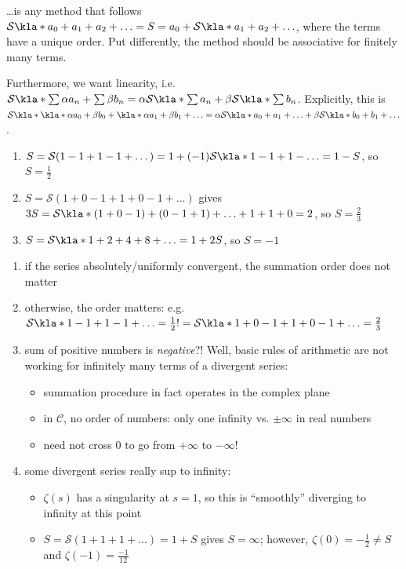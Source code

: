 \documentclass[english, parskip=full]{scrbook}
\newcommand{\definition}[2]{\begin{tcolorbox}[colback=colorbackgrounddefinition,colframe=colordefinition, breakable,enhanced,title=\textbf{#1}.]#2\end{tcolorbox}}
\newcommand{\note}[1]{\begin{tcolorbox}[colback=colorbackgroundnote,colframe=colornote, breakable,enhanced]#1\end{tcolorbox}}
\newcommand{\example}[3]{\begin{tcolorbox}[colback=colorbackgroundexample,colframe=colorexample, breakable,enhanced,title={\textbf{#1}: #2.}]#3\end{tcolorbox}}
\begin{document}
\definition{Generic Summation}{
\dots is any method that follows $\mathcal{S}\kla*{a_0+a_1+a_2+\dots}=S=a_0 + \mathcal{S}\kla*{a_1+a_2+\dots}$, where the terms have a unique order.
Put differently, the method should be associative for finitely many terms.

Furthermore, we want linearity, i.e. $\mathcal{S}\kla*{\sum \alpha a_n + \sum \beta b_n} = \alpha \mathcal{S}\kla*{\sum a_n} + \beta \mathcal{S}\kla*{\sum b_n}$.
Explicitly, this is $\mathcal{S}\kla*{\kla*{\alpha a_0 + \beta b_0} + \kla*{\alpha a_1 + \beta b_1} + \dots} = \alpha \mathcal{S}\kla*{a_0 + a_1 + \dots} + \beta \mathcal{S}\kla*{b_0 + b_1 + \dots}$.
\example{Example}{}{
\begin{enumerate}
\item $S=\mathcal{S}(1-1+1-1+\dots) = 1 + (-1) \mathcal{S}\kla*{1 - 1+1-\dots} = 1-S$, so $S=\frac{1}{2}$
\item $S=\mathcal{S}(1+0-1+1+0-1+\dots)$ gives $3S=\mathcal{S}\kla*{(1+0-1) + (0-1+1) + \dots} + 1 + 1 + 0 = 2$, so $S=\frac{2}{3}$
\item $S=\mathcal{S}\kla*{1+2+4+8+\dots} = 1 + 2S$, so $S=-1$
\end{enumerate}
}
}
\note{
\begin{enumerate}
\item if the series absolutely/uniformly convergent, the summation order does not matter
\item otherwise, the order matters: e.g. $\mathcal{S}\kla*{1-1+1-1+\dots} = \frac{1}{2} != \mathcal{S}\kla*{1+0-1+1+0-1+\dots} = \frac{2}{3}$
\item sum of positive numbers is \emph{negative}?! Well, basic rules of arithmetic are not working for infinitely many terms of a divergent series:
\begin{itemize}
\item summation procedure in fact operates in the complex plane
\item in $\mathcal{C}$, no order of numbers: only one infinity vs. $\pm\infty$ in real numbers
\item need not cross 0 to go from $+\infty$ to $-\infty$!
\end{itemize}
\item some divergent series really sup to infinity:
\begin{itemize}
\item $\zeta(s)$ has a singularity at $s=1$, so this is \enquote{smoothly} diverging to infinity at this point
\item $S=\mathcal{S}(1+1+1+\dots) = 1 + S$ gives $S=\infty$; however, $\zeta(0)=-\frac{1}{2} \neq S$ and $\zeta(-1) = \frac{-1}{12}$
\end{itemize}
\end{enumerate}
}
\end{document}
